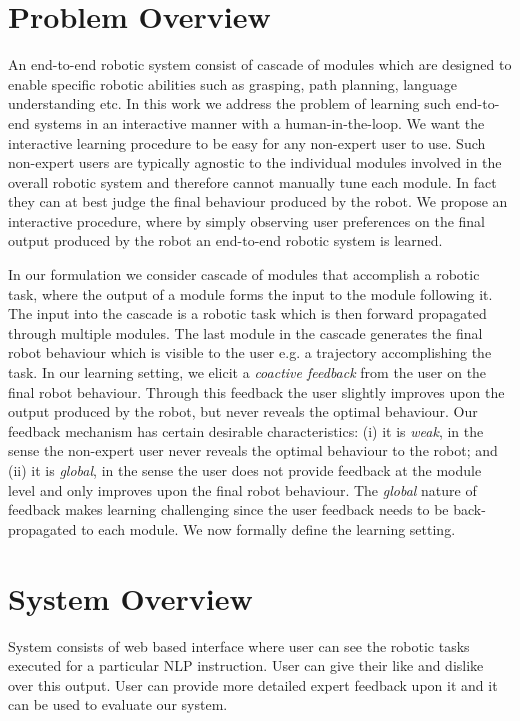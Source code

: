 \section{Problem Overview}

An end-to-end robotic system consist of cascade of modules which are designed to enable specific robotic abilities such as grasping, path planning, language understanding etc. In this
work we address the problem of learning such end-to-end systems in an interactive manner with a human-in-the-loop. We want the interactive learning procedure to be easy for any non-expert user to use. Such non-expert users are typically agnostic to the individual modules involved in the overall robotic system and therefore cannot manually tune each module. In fact they can at best judge the final behaviour produced by the robot. We propose an interactive procedure, where by simply observing user preferences on the final output produced by the robot an end-to-end robotic system is learned.

In our formulation we consider cascade of modules that accomplish a robotic task, where the output of a module forms the input to the module following it. The input into the cascade is a robotic task which is then forward propagated through multiple modules. The last module in the cascade generates the final robot behaviour which is visible to the user e.g. a trajectory accomplishing the task. In our learning setting, we elicit a \textit{coactive feedback} from the user on the final robot behaviour. Through this feedback the user slightly improves upon the output produced by the robot, but never reveals the optimal behaviour. Our feedback mechanism has certain desirable characteristics: (i) it is \textit{weak}, in the sense the non-expert user never reveals the optimal behaviour to the robot; and (ii) it is \textit{global}, in the sense the user does not provide feedback at the module level and only improves upon the final robot behaviour. The \textit{global} nature of feedback makes learning challenging since the user feedback needs to be back-
propagated to each module. We now formally define the learning setting.

\section{System Overview}
System consists of web based interface where user can see the robotic tasks
executed for a particular NLP instruction. User can give their like and dislike
over this output. User can provide more detailed expert feedback upon it and it
can be used to evaluate our system.  


